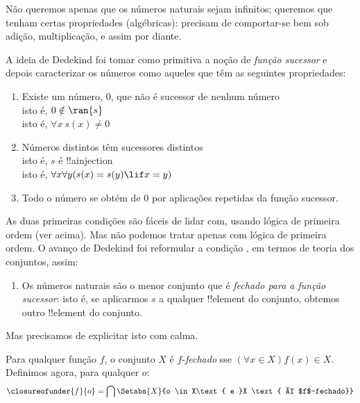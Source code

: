 \documentclass[../../../include/open-logic-section]{subfiles}
\begin{document}

Não queremos apenas que os números naturais sejam infinitos; queremos
que tenham certas propriedades (algébricas): precisam de comportar-se
bem sob adição, multiplicação, e assim por diante.

A ideia de Dedekind foi tomar como primitiva a noção de \emph{função
sucessor} e depois caracterizar os números como aqueles que têm as
seguintes propriedades:
\begin{enumerate}
	\item Existe um número, $0$, que não é sucessor de nenhum número
	\\isto é, $0 \notin \ran{s}$
	\\isto é, $\forall x\ s(x) \neq 0$
	\item Números distintos têm sucessores distintos
	\\isto é, $s$ é !!a{injection}
	\\isto é, $\forall x \forall y (s(x) = s(y) \lif x = y)$
	\item{} Todo o número se obtém de
	$0$ por aplicações repetidas da função sucessor.
\end{enumerate}
As duas primeiras condições são fáceis de lidar com, usando lógica de primeira
ordem (ver acima). Mas não podemos tratar 
apenas com lógica de primeira ordem. O avanço de Dedekind foi reformular
a condição , em termos de teoria dos conjuntos,
assim:
\begin{enumerate}
	\item[3$'$.] Os números naturais são o menor conjunto que é
	\emph{fechado para a função sucessor}: isto é, se aplicarmos
	$s$ a qualquer !!{element} do conjunto, obtemos outro !!{element}
	do conjunto.
\end{enumerate}
Mas precisamos de explicitar isto com calma.

\begin{defn}
	Para qualquer função $f$, o conjunto $X$ é $f$-\emph{fechado} {sse}
	$(\forall x \in X)f(x) \in X$. Definimos agora, para qualquer $o$:
	$$\closureofunder{f}{o} = \bigcap\Setabs{X}{o \in X\text{ e }X
\text{ é $f$-fechado}}$$
\end{defn}
\end{document}
